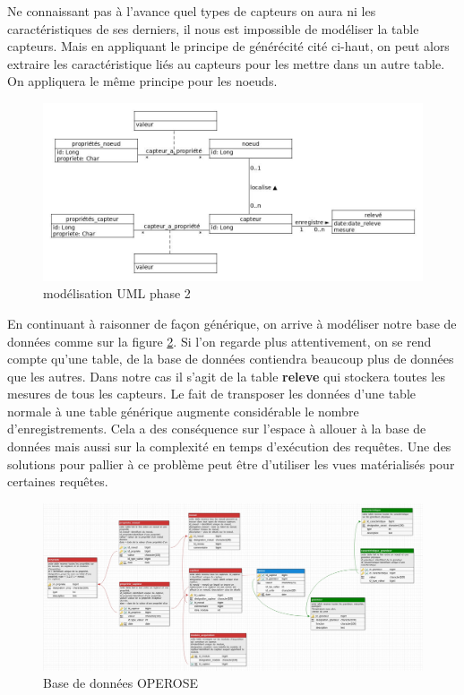Ne connaissant pas à l'avance quel types de capteurs on aura ni les caractéristiques de ses derniers, il nous est impossible de modéliser la table capteurs. Mais en appliquant le principe de générécité cité ci-haut, on peut alors extraire les caractéristique liés au capteurs pour les mettre dans un autre table. On appliquera le même principe pour les noeuds.
\begin{figure}[!h]
   \begin{center}
        \includegraphics[width=1\textwidth]{images/uml_image2.jpg}
    \caption{modélisation UML phase 2}
    \label{fig:modélisation UML phase 2}
   \end{center}
\end{figure}
En continuant à raisonner de façon générique, on arrive à modéliser notre base de données comme sur la figure \ref{ Base de données OPEROSE}. Si l'on regarde plus attentivement, on se rend compte qu'une table, de la base de données contiendra beaucoup plus de données que les autres. Dans notre cas il s'agit de la table \textbf{releve} qui stockera toutes les mesures de tous les capteurs. Le fait de transposer les données d'une table normale à une table générique augmente considérable le nombre d'enregistrements. Cela a des conséquence sur l'espace à allouer à la base de données mais aussi sur la complexité en temps d'exécution des requêtes. Une des solutions pour pallier à ce problème peut être d'utiliser les vues matérialisés pour certaines requêtes.


\begin{landscape}
\begin{figure}
   \begin{center}
       \includegraphics[width=1.8\textwidth]{images/bd_image3.jpg}
    \caption{ Base de données OPEROSE}
     \label{ Base de données OPEROSE}
   \end{center}
\end{figure}
\end{landscape}







